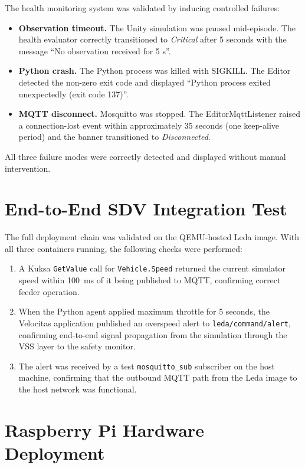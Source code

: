The health monitoring system was validated by inducing controlled
failures:
\begin{itemize}[topsep=1.15pt,itemsep=1.15pt]
  \item \textbf{Observation timeout.} The Unity simulation was paused
    mid-episode. The health evaluator correctly transitioned to
    \textit{Critical} after 5 seconds with the message ``No observation
    received for 5 s''.
  \item \textbf{Python crash.} The Python process was killed with
    SIGKILL. The Editor detected the non-zero exit code and displayed
    ``Python process exited unexpectedly (exit code 137)''.
  \item \textbf{MQTT disconnect.} Mosquitto was stopped. The
    EditorMqttListener raised a connection-lost event within
    approximately 35 seconds (one keep-alive period) and the banner
    transitioned to \textit{Disconnected}.
\end{itemize}
All three failure modes were correctly detected and displayed without
manual intervention.

\section{End-to-End SDV Integration Test}
\label{sec:e2e-test}

The full deployment chain was validated on the QEMU-hosted Leda image.
With all three containers running, the following checks were performed:
\begin{enumerate}[leftmargin=2cm,topsep=1.15pt,itemsep=1.15pt,partopsep=1.15pt,parsep=1.15pt]
  \item A Kuksa \texttt{GetValue} call for \texttt{Vehicle.Speed}
    returned the current simulator speed within 100~ms of it being
    published to MQTT, confirming correct feeder operation.
  \item When the Python agent applied maximum throttle for 5 seconds,
    the Velocitas application published an overspeed alert to
    \texttt{leda/command/alert}, confirming end-to-end signal
    propagation from the simulation through the VSS layer to the safety
    monitor.
  \item The alert was received by a test \texttt{mosquitto\_sub}
    subscriber on the host machine, confirming that the outbound MQTT
    path from the Leda image to the host network was functional.
\end{enumerate}

\section{Raspberry Pi Hardware Deployment}
\label{sec:pi-eval}

